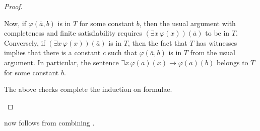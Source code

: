 \documentclass[../notes.tex]{subfiles}
\begin{document}
\begin{proof}
\begin{enumerate}
\begin{itemize}
			Now, if $\varphi(\overline a,b)$ is in $T$ for some constant $b$, then the usual argument with completeness and finite satisfiability requires $(\exists x\,\varphi(x))(\overline a)$ to be in $T$. Conversely, if $(\exists x\,\varphi(x))(\overline a)$ is in $T$, then the fact that $T$ has witnesses implies that there is a constant $c$ such that $\varphi(\overline a,b)$ is in $T$ from the usual argument. In particular, the sentence $\exists x\,\varphi(\overline a)(x)\to\varphi(\overline a)(b)$ belongs to $T$ for some constant $b$.
		\end{itemize}
		The above checks complete the induction on formulae.
		\qedhere
	\end{enumerate}
\end{proof}
 now follows from combining .
\end{document}
